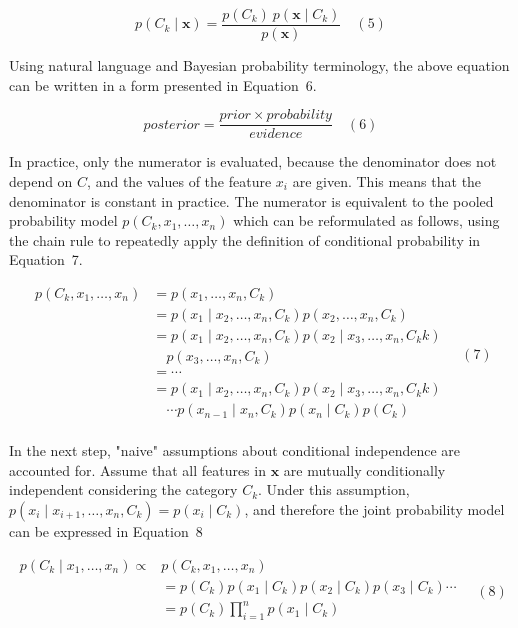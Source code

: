 \documentclass[preprint,12pt]{elsarticle}
\begin{document}
\begin{equation}
	p(C_{k}\mid \mathbf{x})={\frac{p(C_{k})\ p(\mathbf{x} \mid C_{k})}{p(\mathbf{x})}}
	\quad\left(5\right)
\end{equation}

Using natural language and Bayesian probability terminology, the above equation can be written in a form presented in Equation~6.

\begin{equation}
	posterior = \frac{prior \times probability}{evidence}
	\quad\left(6\right)
\end{equation}

In practice, only the numerator is evaluated, because the denominator does not depend on $C$, and the values of the feature $x_{i}$ are given. This means that the denominator is constant in practice. The numerator is equivalent to the pooled probability model $p(C_{k},x_{1},\ldots,x_{n})$ which can be reformulated as follows, using the chain rule to repeatedly apply the definition of conditional probability in Equation~7.

\begin{equation}
	\begin{aligned}
        p(C_{k},x_{1},\ldots,x_{n}) &= p(x_{1},\ldots,x_{n},C_{k}) \\
        &= p(x_{1}\mid x_{2}, \ldots,x_{n},C_{k}) p(x_{2},\ldots,x_{n},C_{k}) \\
        &= p(x_{1}\mid x_{2}, \ldots,x_{n},C_{k}) p(x_{2}\mid x_{3}, \ldots,x_{n},C_{k} {k}) \\
        &\quad p(x_{3},\ldots,x_{n},C_{k}) \\
        &= \cdots \\
        &= p(x_{1}\mid x_{2}, \ldots,x_{n},C_{k}) p(x_{2}\mid x_{3}, \ldots,x_{n},C_{k} {k}) \\
        &\quad \cdots p(x_{n-1}\mid x_{n},C_{k}) p(x_{n}\mid C_{k}) p(C_{k})\\
    \end{aligned}
	\quad\left(7\right)
\end{equation}

In the next step, "naive" assumptions about conditional independence are accounted for. Assume that all features in $\mathbf{x}$ are mutually conditionally independent considering the category $C_{k}$. Under this assumption, $p(x_{i}\mid x_{i+1}, \ldots,x_{n},C_{k}) = p(x_{i}\mid C_{k})$, and therefore the joint probability model can be expressed in Equation~8

\begin{equation}
	\begin{aligned}
        p(C_{k}\mid x_{1},\ldots,x_{n}) \propto &p(C_{k}, x_{1},\ldots,x_{n}) \\
        &= p(C_{k})p(x_{1}\mid C_{k}) p(x_{2}\mid C_{k}) p(x_{3}\mid C_{k}) \cdots \\
        &= p(C_{k}) \prod_{i=1}^{n} p(x_{1}\mid C_{k}) \\
    \end{aligned}
	\quad\left(8\right)
\end{equation}
\end{document}
